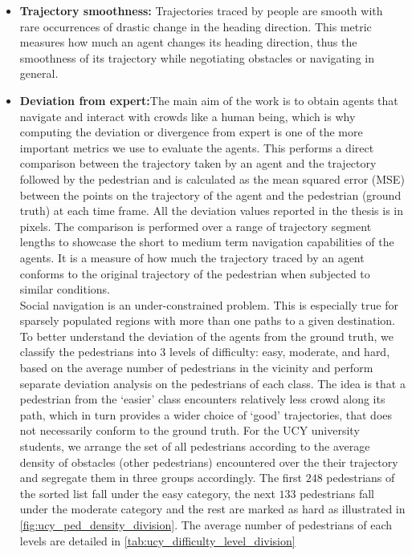 \begin{itemize}
        \item \textbf{Trajectory smoothness:} Trajectories traced by people are smooth with rare occurrences of drastic change in the heading direction. This metric measures how much an agent changes its heading direction, thus the smoothness of its trajectory while negotiating obstacles or navigating in general.
        \item \textbf{Deviation from expert:}The main aim of the work is to obtain agents that navigate and interact with crowds like a human being, which is why computing the deviation or divergence from expert is one of the more important metrics we use to evaluate the agents. This performs a direct comparison between the trajectory taken by an agent and the trajectory followed by the pedestrian and is calculated as the mean squared error (MSE) between the points on the trajectory of the agent and the pedestrian (ground truth) at each time frame. All the deviation values reported in the thesis is in pixels. The comparison is performed over a range of trajectory segment lengths to showcase the short to medium term navigation capabilities of the agents. It is a measure of how much the trajectory traced by an agent conforms to the original trajectory of the pedestrian when subjected to similar conditions.\\
        Social navigation is an under-constrained problem. This is especially true for sparsely populated regions with more than one paths to a given destination. To better understand the deviation of the agents from the ground truth, we classify the pedestrians into 3 levels of difficulty: easy, moderate, and hard, based on the average number of pedestrians in the vicinity and perform separate deviation analysis on the pedestrians of each class. The idea is that a pedestrian from the `easier' class encounters relatively less crowd along its path, which in turn provides a wider choice of `good' trajectories, that does not necessarily conform to the ground truth.
        For the UCY university students, we arrange the set of all pedestrians according to the average density of obstacles (other pedestrians) encountered over the their trajectory and segregate them in three groups accordingly. The first $248$ pedestrians of the sorted list fall under the easy category, the next $133$ pedestrians fall under the moderate category and the rest are marked as hard as illustrated in \autoref{fig:ucy_ped_density_division}. The average number of pedestrians of each levels are detailed in \autoref{tab:ucy_difficulty_level_division}

\end{itemize}
